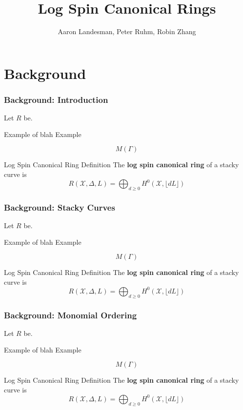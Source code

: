 \documentclass{beamer}
\title{Log Spin Canonical Rings}
\author{Aaron Landesman\inst{1}, Peter Ruhm\inst{2}, Robin Zhang\inst{3}}
\institute[] %
{
  \inst{1}
	Harvard University
	,
  \inst{2}
	Stanford University
  ,
  \inst{3}
	Stanford University
}
\theoremstyle{remark}
\newcommand \sx{{\mathscr X}}
\newcommand{\halfcan}{L}
\begin{document}
\begin{frame}
	\titlepage
\end{frame}

\section{Background} 

\begin{frame}
\frametitle{Background: Introduction}
Let $R$ be.

\pause
\begin{exampleblock}{Example of blah}
Example
\end{exampleblock}

\pause
\[
   M(\Gamma)
\]

\pause
\begin{alertblock}{Log Spin Canonical Ring Definition}
The \textbf{log spin canonical ring} of a stacky curve is
\[
	R(\sx, \Delta, \halfcan) = \bigoplus_{d \geq 0} H^0(\sx, \lfloor d \halfcan \rfloor)
\]
\end{alertblock}

\end{frame}


\begin{frame}
\frametitle{Background: Stacky Curves}
Let $R$ be.

\pause
\begin{exampleblock}{Example of blah}
Example
\end{exampleblock}

\pause
\[
   M(\Gamma)
\]

\pause
\begin{alertblock}{Log Spin Canonical Ring Definition}
The \textbf{log spin canonical ring} of a stacky curve is
\[
	R(\sx, \Delta, \halfcan) = \bigoplus_{d \geq 0} H^0(\sx, \lfloor d \halfcan \rfloor)
\]
\end{alertblock}

\end{frame}


\begin{frame}
\frametitle{Background: Monomial Ordering}
Let $R$ be.

\pause
\begin{exampleblock}{Example of blah}
Example
\end{exampleblock}

\pause
\[
   M(\Gamma)
\]

\pause
\begin{alertblock}{Log Spin Canonical Ring Definition}
The \textbf{log spin canonical ring} of a stacky curve is
\[
	R(\sx, \Delta, \halfcan) = \bigoplus_{d \geq 0} H^0(\sx, \lfloor d \halfcan \rfloor)
\]
\end{alertblock}

\end{frame}
\end{document}
